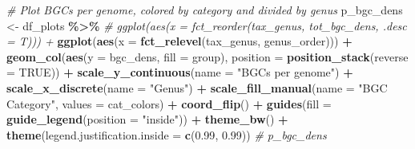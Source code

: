 \documentclass[
]{article}
\newenvironment{Shaded}{\begin{snugshade}}{\end{snugshade}}
\newcommand{\AttributeTok}[1]{\textcolor[rgb]{0.13,0.29,0.53}{#1}}
\newcommand{\CommentTok}[1]{\textcolor[rgb]{0.56,0.35,0.01}{\textit{#1}}}
\newcommand{\ConstantTok}[1]{\textcolor[rgb]{0.56,0.35,0.01}{#1}}
\newcommand{\FloatTok}[1]{\textcolor[rgb]{0.00,0.00,0.81}{#1}}
\newcommand{\FunctionTok}[1]{\textcolor[rgb]{0.13,0.29,0.53}{\textbf{#1}}}
\newcommand{\NormalTok}[1]{#1}
\newcommand{\OtherTok}[1]{\textcolor[rgb]{0.56,0.35,0.01}{#1}}
\newcommand{\SpecialCharTok}[1]{\textcolor[rgb]{0.81,0.36,0.00}{\textbf{#1}}}
\newcommand{\StringTok}[1]{\textcolor[rgb]{0.31,0.60,0.02}{#1}}
\begin{document}
\begin{Shaded}
\begin{Highlighting}[]
\CommentTok{\# Plot BGCs per genome, colored by category and divided by genus}
\NormalTok{p\_bgc\_dens }\OtherTok{\textless{}{-}}\NormalTok{ df\_plots }\SpecialCharTok{\%\textgreater{}\%}
  \CommentTok{\# ggplot(aes(x = fct\_reorder(tax\_genus, tot\_bgc\_dens, .desc = T))) +}
  \FunctionTok{ggplot}\NormalTok{(}\FunctionTok{aes}\NormalTok{(}\AttributeTok{x =} \FunctionTok{fct\_relevel}\NormalTok{(tax\_genus, genus\_order))) }\SpecialCharTok{+}
  \FunctionTok{geom\_col}\NormalTok{(}\FunctionTok{aes}\NormalTok{(}\AttributeTok{y =}\NormalTok{ bgc\_dens, }\AttributeTok{fill =}\NormalTok{ group), }\AttributeTok{position =} \FunctionTok{position\_stack}\NormalTok{(}\AttributeTok{reverse =} \ConstantTok{TRUE}\NormalTok{)) }\SpecialCharTok{+}
  \FunctionTok{scale\_y\_continuous}\NormalTok{(}\AttributeTok{name =} \StringTok{"BGCs per genome"}\NormalTok{) }\SpecialCharTok{+}
  \FunctionTok{scale\_x\_discrete}\NormalTok{(}\AttributeTok{name =} \StringTok{"Genus"}\NormalTok{) }\SpecialCharTok{+}
  \FunctionTok{scale\_fill\_manual}\NormalTok{(}\AttributeTok{name =} \StringTok{"BGC Category"}\NormalTok{, }\AttributeTok{values =}\NormalTok{ cat\_colors) }\SpecialCharTok{+}
  \FunctionTok{coord\_flip}\NormalTok{() }\SpecialCharTok{+}
  \FunctionTok{guides}\NormalTok{(}\AttributeTok{fill =} \FunctionTok{guide\_legend}\NormalTok{(}\AttributeTok{position =} \StringTok{"inside"}\NormalTok{)) }\SpecialCharTok{+}
  \FunctionTok{theme\_bw}\NormalTok{() }\SpecialCharTok{+}
  \FunctionTok{theme}\NormalTok{(}\AttributeTok{legend.justification.inside =} \FunctionTok{c}\NormalTok{(}\FloatTok{0.99}\NormalTok{, }\FloatTok{0.99}\NormalTok{))}
\CommentTok{\# p\_bgc\_dens}


\end{Highlighting}
\end{Shaded}
\end{document}
